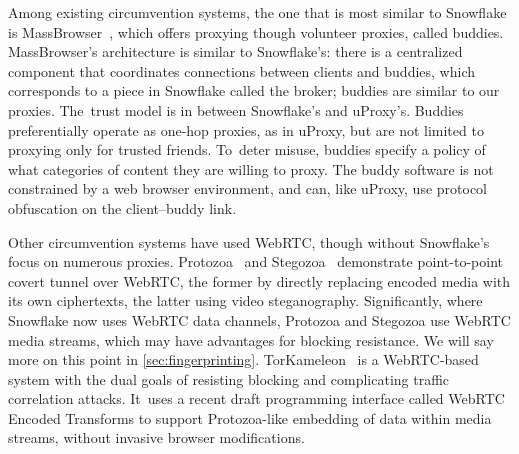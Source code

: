 \documentclass[letterpaper,twocolumn]{article}
\begin{document}
Among existing circumvention systems,
the one that is most similar to Snowflake is MassBrowser~\cite{Nasr2020a},
which offers
proxying though volunteer proxies, called buddies.
MassBrowser's architecture is similar to Snowflake's:
there is a centralized component that coordinates
connections between clients and buddies,
which corresponds to a piece in Snowflake called the broker;
buddies are similar to our proxies.
The~trust model is in between Snowflake's and uProxy's.
Buddies preferentially operate as one-hop proxies, as in uProxy,
but are not limited to proxying only for trusted friends.
To~deter misuse, buddies specify a policy of
what categories of content they are willing to proxy.
The buddy software is
not constrained by a web browser environment,
and can, like uProxy, use protocol obfuscation
on the client--buddy link.

Other circumvention systems have used WebRTC,
though without Snowflake's focus on numerous proxies.
Protozoa~\cite{Barradas2020a}
and Stegozoa~\cite{Figueira2022a}
demonstrate point-to-point covert tunnel over WebRTC,
the former by directly replacing encoded media
with its own ciphertexts,
the latter using video steganography.
Significantly, where Snowflake now uses WebRTC data channels,
Protozoa and Stegozoa use WebRTC media streams,
which may have advantages for blocking resistance.
We will say more on this point in \autoref{sec:fingerprinting}.
TorKameleon~\cite{Vilalonga2023a} is a WebRTC-based system
with the dual goals of resisting blocking
and complicating traffic correlation attacks.
It~uses a recent draft programming interface called
WebRTC Encoded Transforms
to support Protozoa-like
embedding of data within media streams,
without invasive browser modifications.
\end{document}
